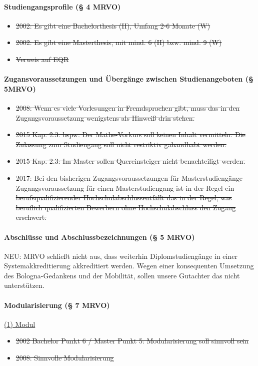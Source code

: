       \paragraph{Studiengangsprofile (§ 4 MRVO)}
        \begin{itemize}
          \item \sout{2002: Es gibt eine Bachelorthesis (H), Umfang 2-6 Monate (W)}
          \item \sout{2002: Es gibt eine Masterthesis, mit mind. 6 (H) bzw. mind. 9 (W)}
          \item \sout{Verweis auf EQR}
        \end{itemize}

      \paragraph{Zugansvoraussetzungen und Übergänge zwischen Studienangeboten (§ 5MRVO)}
        \begin{itemize}
          \item \sout{2008: Wenn es viele Vorlesungen in Fremdsprachen gibt, muss das in den Zugangsvoraussetzung wenigstens als Hinweiß drin stehen.}
          \item \sout{2015 Kap. 2.3: bspw: Der Mathe-Vorkurs soll keinen Inhalt vermitteln. Die Zulassung zum Studiengang soll nicht restriktiv gahandhabt werden.}
          \item \sout{2015 Kap. 2.3: Im Master sollen Quereinsteiger nicht benachteiligt werden.}
          \item \sout{2017: Bei den bisherigen Zugangsvoraussetzungen für Masterstudiengänge \flqq Zugangsvoraussetzung für einen Masterstudiengang ist in der Regel ein berufsqualifizierender Hochschulabschluss\frqq entfällt das \flqq in der Regel\frqq, was beruflich qualifizierten Bewerbern ohne Hochschulabschluss den Zugang erschwert.}
        \end{itemize}

      \paragraph{Abschlüsse und Abschlussbezeichnungen (§ 5 MRVO)}
        NEU: MRVO schließt nicht aus, dass weiterhin Diplomstudiengänge in einer Systemakkreditierung akkreditiert werden.
        Wegen einer konsequenten Umsetzung des Bologna-Gedankens und der Mobilität, sollen unsere Gutachter das nicht unterstützen.


      \paragraph{Modularisierung (§ 7 MRVO)} 
        \underline{(1) Modul}
          \begin{itemize}
            \item \sout{2002 Bachelor Punkt 6 / Master Punkt 5: Modularisierung soll sinnvoll sein}
            \item \sout{2008: Sinnvolle Modularisierung}
          \end{itemize}

